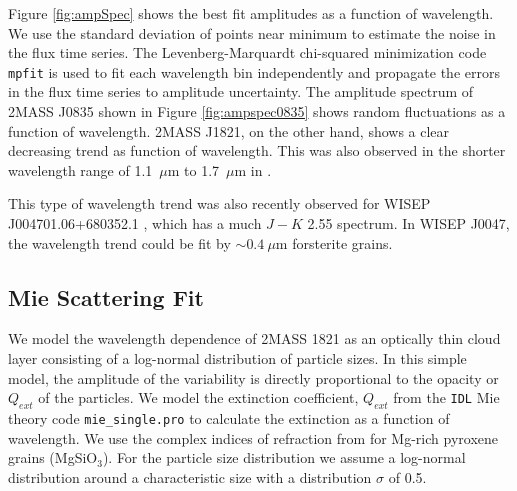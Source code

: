 \documentclass[twocolumn]{aastex6}
\begin{document}
Figure \ref{fig:ampSpec} shows the best fit amplitudes as a function of wavelength.
We use the standard deviation of points near minimum to estimate the noise in the flux time series.
The Levenberg-Marquardt chi-squared minimization code \texttt{mpfit} is used to fit each wavelength bin independently and propagate the errors in the flux time series to amplitude uncertainty.
The amplitude spectrum of 2MASS J0835 shown in Figure \ref{fig:ampspec0835} shows random fluctuations as a function of wavelength.
2MASS J1821, on the other hand, shows a clear decreasing trend as function of wavelength.
This was also observed in the shorter wavelength range of 1.1~$\mu$m to 1.7~$\mu$m in \citet{yang2016exStormsBD}.

This type of wavelength trend was also recently observed for WISEP J004701.06+680352.1 \citep{lew2016w0047}, which has a much $J-K$ 2.55 spectrum.
In WISEP J0047, the wavelength trend could be fit by $\sim 0.4~\mu$m forsterite grains.


\subsection{Mie Scattering Fit}

We model the wavelength dependence of 2MASS 1821 as an optically thin cloud layer consisting of a log-normal distribution of particle sizes.
In this simple model, the amplitude of the variability is directly proportional to the opacity or $Q_{ext}$ of the particles.
We model the extinction coefficient, $Q_{ext}$ from the \texttt{IDL} Mie theory code \texttt{mie\_single.pro} \citep{grainger04} to calculate the extinction as a function of wavelength.
We use the complex indices of refraction from \citet{dorschner95pyrox} for Mg-rich pyroxene grains (MgSiO$_3$).
For the particle size distribution we assume a log-normal distribution around a characteristic size with a distribution $\sigma$ of 0.5.
\end{document}
